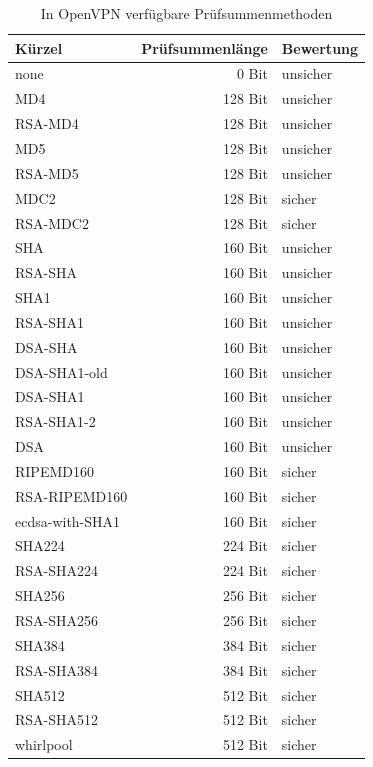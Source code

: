 \begin{description}
  \begin{table}[!ht]
    \centering
    \caption{In OpenVPN verfügbare Prüfsummenmethoden}
    \label{openvpn:digests}
    \begin{tabular}{|p{4cm}|r|l|}
      \hline
      Kürzel           & Prüfsummenlänge & Bewertung \\
      \hline
      none             &   0 Bit & unsicher \\
      MD4              & 128 Bit & unsicher \\
      RSA-MD4          & 128 Bit & unsicher \\
      MD5              & 128 Bit & unsicher \\
      RSA-MD5          & 128 Bit & unsicher \\
      MDC2             & 128 Bit & sicher \\
      RSA-MDC2         & 128 Bit & sicher \\
      SHA              & 160 Bit & unsicher \\
      RSA-SHA          & 160 Bit & unsicher \\
      SHA1             & 160 Bit & unsicher \\
      RSA-SHA1         & 160 Bit & unsicher \\
      DSA-SHA          & 160 Bit & unsicher \\
      DSA-SHA1-old     & 160 Bit & unsicher \\
      DSA-SHA1         & 160 Bit & unsicher \\
      RSA-SHA1-2       & 160 Bit & unsicher \\
      DSA              & 160 Bit & unsicher \\
      RIPEMD160        & 160 Bit & sicher \\
      RSA-RIPEMD160    & 160 Bit & sicher \\
      ecdsa-with-SHA1  & 160 Bit & sicher \\
      SHA224           & 224 Bit & sicher \\
      RSA-SHA224       & 224 Bit & sicher \\
      SHA256           & 256 Bit & sicher \\
      RSA-SHA256       & 256 Bit & sicher \\
      SHA384           & 384 Bit & sicher \\
      RSA-SHA384       & 384 Bit & sicher \\
      SHA512           & 512 Bit & sicher \\
      RSA-SHA512       & 512 Bit & sicher \\
      whirlpool        & 512 Bit & sicher \\
      \hline
    \end{tabular}
  \end{table}


\end{description}
